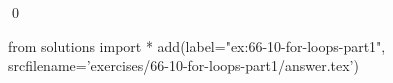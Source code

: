 
\begin{ex}
  \label{ex:66-10-for-loops-part1}
  
  \qed
\end{ex}
\begin{python0}
from solutions import *
add(label="ex:66-10-for-loops-part1",
    srcfilename='exercises/66-10-for-loops-part1/answer.tex')
\end{python0}
